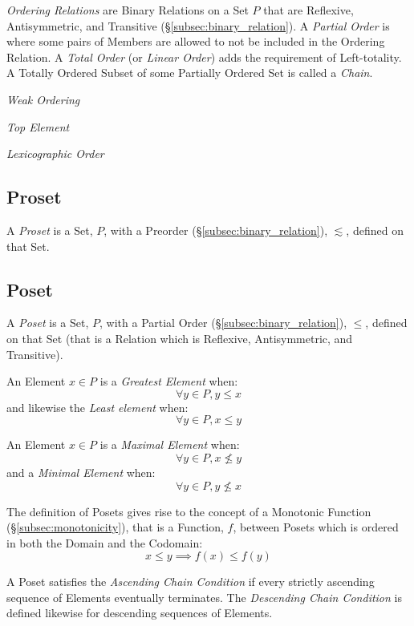 \documentclass{article}
\begin{document}
\emph{Ordering Relations} are Binary Relations on a Set $P$ that are
Reflexive, Antisymmetric, and Transitive
(\S\ref{subsec:binary_relation}). A \emph{Partial Order} is where some
pairs of Members are allowed to not be included in the Ordering
Relation. A \emph{Total Order} (or \emph{Linear Order}) adds the
requirement of Left-totality. A Totally Ordered Subset of some
Partially Ordered Set is called a \emph{Chain}.

\emph{Weak Ordering}

\emph{Top Element}

\emph{Lexicographic Order}



\subsection{Proset}\label{subsec:proset}

A \emph{Proset} is a Set, $P$, with a Preorder
(\S\ref{subsec:binary_relation}), $\lesssim$, defined on that Set.



\subsection{Poset}\label{subsec:poset}

A \emph{Poset} is a Set, $P$, with a Partial Order
(\S\ref{subsec:binary_relation}), $\leq$, defined on that Set (that is
a Relation which is Reflexive, Antisymmetric, and Transitive).

An Element $x \in P$ is a \emph{Greatest Element} when:
\[
    \forall y \in P, y \leq x
\]
and likewise the \emph{Least element} when:
\[
    \forall y \in P, x \leq y
\]

An Element $x \in P$ is a \emph{Maximal Element} when:
\[
    \forall y \in P, x \nleq y
\]
and a \emph{Minimal Element} when:
\[
    \forall y \in P, y \nleq x
\]

The definition of Posets gives rise to the concept of a Monotonic
Function (\S\ref{subsec:monotonicity}), that is a Function, $f$,
between Posets which is ordered in both the Domain and the Codomain:
\[
    x \leq y \implies f(x) \leq f(y)
\]

A Poset satisfies the \emph{Ascending Chain Condition} if every
strictly ascending sequence of Elements eventually terminates. The
\emph{Descending Chain Condition} is defined likewise for descending
sequences of Elements.
\end{document}
